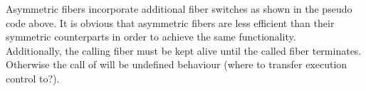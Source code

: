 Asymmetric fibers incorporate additional fiber switches as shown in the pseudo
code above. It is obvious that asymmetric fibers are less efficient than their
symmetric counterparts in order to achieve the same functionality.\\
Additionally, the calling fiber must be kept alive until the called fiber
terminates. Otherwise the call of  will be undefined behaviour
(where to transfer execution control to?).\\

